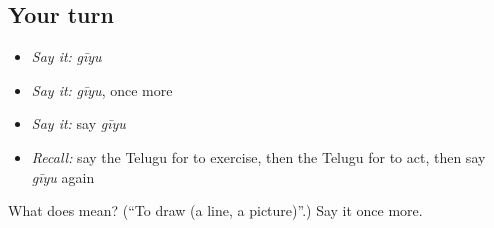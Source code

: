 \subsection*{Your turn}
\begin{itemize}
\raggedright
  \item \emph{Say it:} \emph{gīyu}
  \item \emph{Say it:} \emph{gīyu}, once more
  \item \emph{Say it:} say \emph{gīyu}
  \item \emph{Recall:} say the Telugu for to exercise, then the Telugu for to act, then say \emph{gīyu} again
\end{itemize}

\begin{tcolorbox}[breakable,colback=teal!4,colframe=teal!35!black,title={Before you move on}]
What does  mean? (\textquotedblleft{}To draw (a line, a picture)\textquotedblright{}.) Say it once more.
\end{tcolorbox}
